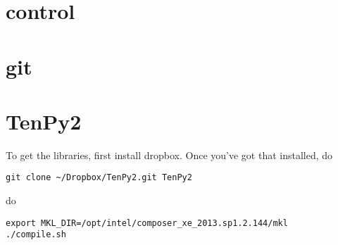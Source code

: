 \section{control}

\section{git}

\section{TenPy2}
To get the libraries, first install dropbox. Once you've got that installed, do
\begin{verbatim}
git clone ~/Dropbox/TenPy2.git TenPy2
\end{verbatim}
do
\begin{verbatim}
export MKL_DIR=/opt/intel/composer_xe_2013.sp1.2.144/mkl
./compile.sh
\end{verbatim}

